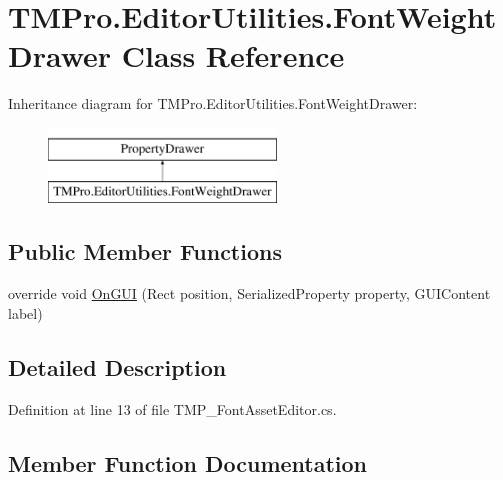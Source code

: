 \hypertarget{class_t_m_pro_1_1_editor_utilities_1_1_font_weight_drawer}{}\section{T\+M\+Pro.\+Editor\+Utilities.\+Font\+Weight\+Drawer Class Reference}
\label{class_t_m_pro_1_1_editor_utilities_1_1_font_weight_drawer}
Inheritance diagram for T\+M\+Pro.\+Editor\+Utilities.\+Font\+Weight\+Drawer\+:\begin{figure}[H]
\begin{center}
\leavevmode
\includegraphics[height=2.000000cm]{class_t_m_pro_1_1_editor_utilities_1_1_font_weight_drawer}
\end{center}
\end{figure}
\subsection*{Public Member Functions}
\begin{DoxyCompactItemize}
\item 
override void \mbox{\hyperlink{class_t_m_pro_1_1_editor_utilities_1_1_font_weight_drawer_acc64a7753f9f5a87f56a862f1ed5b62f}{On\+G\+UI}} (Rect position, Serialized\+Property property, G\+U\+I\+Content label)
\end{DoxyCompactItemize}


\subsection{Detailed Description}


Definition at line 13 of file T\+M\+P\+\_\+\+Font\+Asset\+Editor.\+cs.



\subsection{Member Function Documentation}
\mbox{\label{class_t_m_pro_1_1_editor_utilities_1_1_font_weight_drawer_acc64a7753f9f5a87f56a862f1ed5b62f}} 
